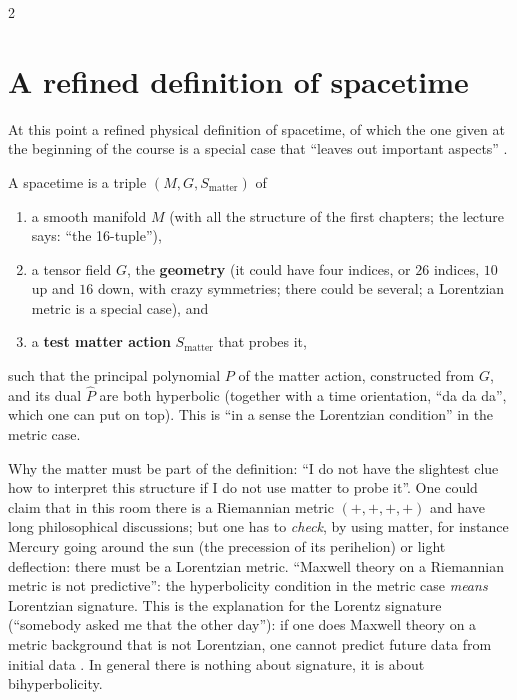 \begin{paracol}{2}
\section{A refined definition of spacetime}\label{sec:c26-spacetime}

At this point a refined physical definition of spacetime, of which the one given at the beginning of the course is a special case that ``leaves out important aspects'' .

\begin{definition}\label{def:c26-spacetime}
A spacetime is a triple $(M,G,S_{\mathrm{matter}})$ of
\begin{enumerate}
  \item a smooth manifold $M$ (with all the structure of the first chapters; the lecture says: ``the 16-tuple''),
  \item a tensor field $G$, the \textbf{geometry} (it could have four indices, or $26$ indices, $10$ up and $16$ down, with crazy symmetries; there could be several; a Lorentzian metric is a special case), and
  \item a \textbf{test matter action} $S_{\mathrm{matter}}$ that probes it,
\end{enumerate}
such that the principal polynomial $P$ of the matter action, constructed from $G$, and its dual $\hat P$ are both hyperbolic (together with a time orientation, ``da da da'', which one can put on top). This is ``in a sense the Lorentzian condition'' in the metric case.
\end{definition}

Why the matter must be part of the definition: ``I do not have the slightest clue how to interpret this structure if I do not use matter to probe it''. One could claim that in this room there is a Riemannian metric $(+,+,+,+)$ and have long philosophical discussions; but one has to \emph{check}, by using matter, for instance Mercury going around the sun (the precession of its perihelion) or light deflection: there must be a Lorentzian metric. ``Maxwell theory on a Riemannian metric is not predictive'': the hyperbolicity condition in the metric case \emph{means} Lorentzian signature. This is the explanation for the Lorentz signature (``somebody asked me that the other day''): if one does Maxwell theory on a metric background that is not Lorentzian, one cannot predict future data from initial data . In general there is nothing about signature, it is about bihyperbolicity.


\end{paracol}
